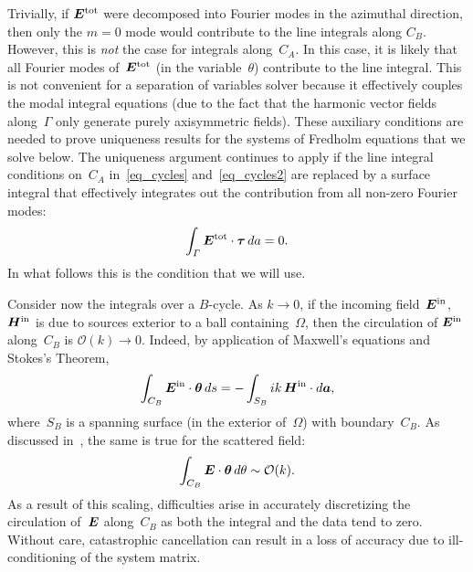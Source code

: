 \documentclass[11pt]{article}
\newcommand{\vct}{\vectorsym}
\newcommand{\bE}{\vectorsym{E}}
\newcommand\thetahat{{\vct{{\theta}}}}
\newcommand\cO{\mathcal O}
\newcommand\btau{\vct{\tau}}
\newcommand\ba{\vct{a}}
\newcommand\bEtot{\vct{E}^\textnormal{tot}}
\newcommand\bEin{\vct{E}^\textnormal{in}}
\newcommand\bHin{\vct{H}^\textnormal{in}}
\numberwithin{equation}{section}
\begin{document}
Trivially, if $\bEtot$ were decomposed into Fourier modes in the
azimuthal direction, then only the $m=0$ mode would contribute to the
line integrals along $C_B$. However, this is \emph{not} the case for
integrals along~$C_A$. In this case, it is likely that all Fourier
modes of~$\bEtot$ (in the variable~$\theta$)
contribute to the line integral. This is not
convenient for a separation of variables solver because it
effectively couples the modal integral equations (due to the fact that
the harmonic vector fields along~$\Gamma$ only generate purely
axisymmetric fields). These auxiliary conditions are needed to prove
uniqueness results for the systems of Fredholm equations that we solve 
below. The uniqueness argument continues to apply if
the line integral conditions on~$C_A$
in~\eqref{eq_cycles} and~\eqref{eq_cycles2} are replaced by a surface
integral that effectively integrates out the contribution from all 
non-zero Fourier modes:
\begin{equation}
\int_\Gamma \bEtot \cdot \btau \, da  = 0.
\end{equation}
In what follows this is the condition that we will use.

Consider now the integrals over a $B$-cycle.
As $k \to 0$, if the incoming field~$\bEin$,~$\bHin$
is due to sources exterior to a ball containing~$\Omega$, then the circulation of $\bEin$
along~$C_B$ is $\cO(k) \to 0$. Indeed, by
application of Maxwell's equations and Stokes's Theorem,
\begin{equation}
\int_{C_B} \bEin \cdot \thetahat \, ds = -\int_{S_B} ik \, \bHin
\cdot d\ba,
\end{equation}
where~$S_B$ is a spanning surface (in the exterior of~$\Omega$)
with boundary~$C_B$. 
As discussed in~\cite{epstein-2013,EpGrOn}, the same is true for the scattered field:
\begin{equation}\label{eq_scaling}
    \int_{C_B} \bE \cdot \thetahat \, d\theta \sim \cO(k).
\end{equation}
As a result of this scaling,
difficulties arise in accurately discretizing the circulation of~$\bE$
along~$C_B$ as both the integral and the data tend to zero.
Without care, catastrophic cancellation can result in a loss of
accuracy due to ill-conditioning of the system matrix.
\end{document}
